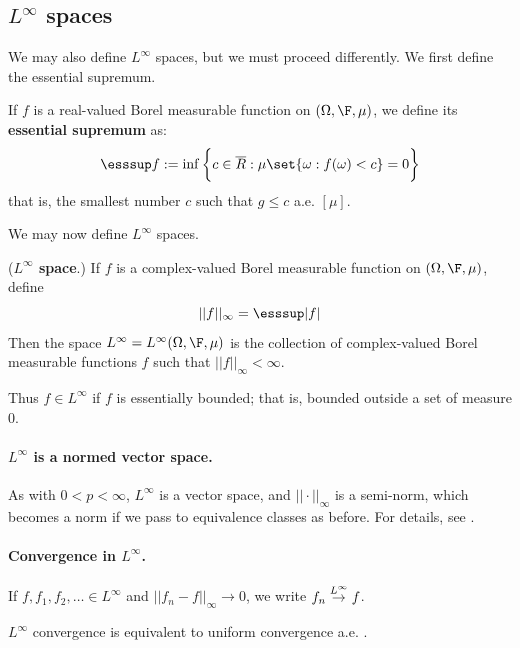 \documentclass{article} %
\begin{document}
\subsection{$L^\infty$ spaces} \label{sec:L_infty_spaces}

We may also define $L^\infty$ spaces, but we must proceed differently.   We first define the essential supremum.

\begin{definition}
If $f$ is a real-valued Borel measurable function on $(\Omega, \F, \mu)$, we define its \textbf{essential supremum} as:
\[ \esssup f := \inf \bigg\{c \in \overline{R} : \mu\set{\omega : f(\omega) < c} = 0 \bigg\} \]
that is, the smallest number $c$ such that $g \leq c$ a.e. $[\mu]$.
\end{definition}


We may now define $L^\infty$ spaces.

\begin{definition}{(\textbf{$L^\infty$ space}.)} If $f$ is a complex-valued Borel measurable function on $(\Omega, \F, \mu)$, define 
\[  ||f||_\infty = \esssup |f|\]
Then the space $L^\infty = L^\infty(\Omega, \F, \mu)$ is the collection of complex-valued Borel measurable functions $f$ such that $||f||_\infty < \infty$.
\end{definition}

Thus $f \in L^\infty$ if $f$ is essentially bounded; that is, bounded outside a set of measure 0.

\paragraph{$L^\infty$ is a normed vector space.} As with $0<p<\infty$, $L^\infty$ is a vector space, and $||\cdot||_\infty$ is a semi-norm, which becomes a norm if we pass to equivalence classes as before.  For details, see \cite[pp.93]{ash2000probability}.

\paragraph{Convergence in $L^\infty$.} If $f,f_1,f_2,\hdots \in L^\infty$ and $||f_n - f||_\infty \to 0$, we write $f_n \stackrel{L^\infty}{\to} f$.  

\begin{remark}
$L^\infty$ convergence is equivalent to uniform convergence a.e. \cite[pp.93]{ash2000probability}.
\label{rk:L_infty_convergence_is_equivalent_to_uniform_cconvergence_ae}
\end{remark}
\end{document}
